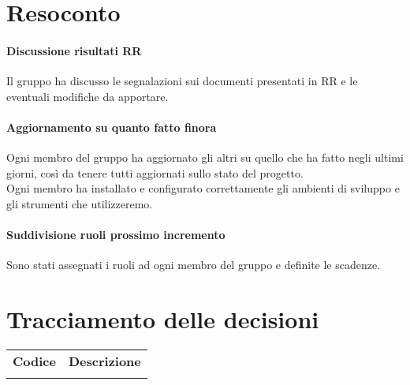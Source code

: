\documentclass{article}
\begin{document}
\section{Resoconto}%
\label{resoconto}
\paragraph*{Discussione risultati RR}
Il gruppo ha discusso le segnalazioni sui documenti presentati in RR e le eventuali modifiche da apportare.
\paragraph*{Aggiornamento su quanto fatto finora}
Ogni membro del gruppo ha aggiornato gli altri su quello che ha fatto negli ultimi giorni, così da tenere tutti aggiornati sullo stato del progetto.\\
Ogni membro ha installato e configurato correttamente gli ambienti di sviluppo e gli strumenti che utilizzeremo.
\paragraph*{Suddivisione ruoli prossimo incremento}
Sono stati assegnati i ruoli ad ogni membro del gruppo e definite le scadenze.


\section{Tracciamento delle decisioni}
\begin{table}[H]
  \centering
  \begin{tabular}{p{4cm}|p{12cm}}
    \rowcolor{lightgray}
    \textbf{Codice}  & \textbf{Descrizione}      \\
      &  \\
  \end{tabular}
\end{table}
\end{document}
